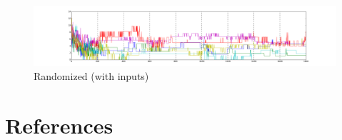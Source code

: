 \documentclass[12pt]{article}
\begin{document}
\begin{figure}[H]
    \centering
    \includegraphics[width=\textheight,angle=270,keepaspectratio]{../visualizations/8knodes_sensors_lineannotated.png}
    \caption{Randomized (with inputs)}
\end{figure}


\newpage

\section{References}

\printbibliography[heading=none]
\end{document}
